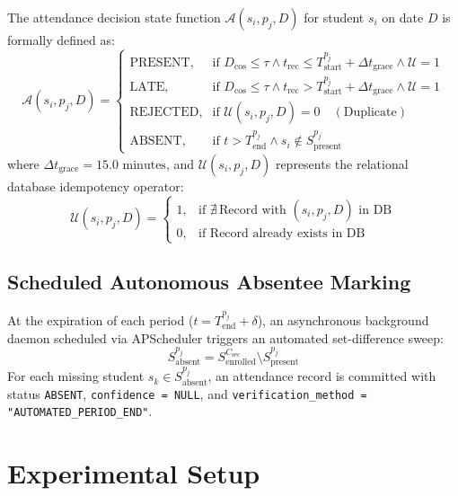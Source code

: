 \documentclass[conference]{IEEEtran}
\begin{document}
The attendance decision state function $\mathcal{A}(s_i, p_j, D)$ for student $s_i$ on date $D$ is formally defined as:
\begin{equation}
\mathcal{A}(s_i, p_j, D) = \begin{cases} 
\text{PRESENT}, & \text{if } D_{\cos} \le \tau \wedge t_{\text{rec}} \le T_{\text{start}}^{p_j} + \Delta t_{\text{grace}} \wedge \mathcal{U} = 1 \\
\text{LATE},    & \text{if } D_{\cos} \le \tau \wedge t_{\text{rec}} > T_{\text{start}}^{p_j} + \Delta t_{\text{grace}} \wedge \mathcal{U} = 1 \\
\text{REJECTED},& \text{if } \mathcal{U}(s_i, p_j, D) = 0 \quad (\text{Duplicate}) \\
\text{ABSENT},  & \text{if } t > T_{\text{end}}^{p_j} \wedge s_i \notin S_{\text{present}}^{p_j}
\end{cases}
\end{equation}
where $\Delta t_{\text{grace}} = 15.0\text{ minutes}$, and $\mathcal{U}(s_i, p_j, D)$ represents the relational database idempotency operator:
\begin{equation}
\mathcal{U}(s_i, p_j, D) = \begin{cases}
1, & \text{if } \nexists \, \text{Record with } (s_i, p_j, D) \text{ in DB} \\
0, & \text{if Record already exists in DB}
\end{cases}
\end{equation}

\subsection{Scheduled Autonomous Absentee Marking}
At the expiration of each period ($t = T_{\text{end}}^{p_j} + \delta$), an asynchronous background daemon scheduled via APScheduler triggers an automated set-difference sweep:
\begin{equation}
S_{\text{absent}}^{p_j} = S_{\text{enrolled}}^{C_{\text{sec}}} \setminus S_{\text{present}}^{p_j}
\end{equation}
For each missing student $s_k \in S_{\text{absent}}^{p_j}$, an attendance record is committed with status \texttt{ABSENT}, \texttt{confidence = NULL}, and \texttt{verification\_method = "AUTOMATED\_PERIOD\_END"}.

\section{Experimental Setup}
\end{document}
